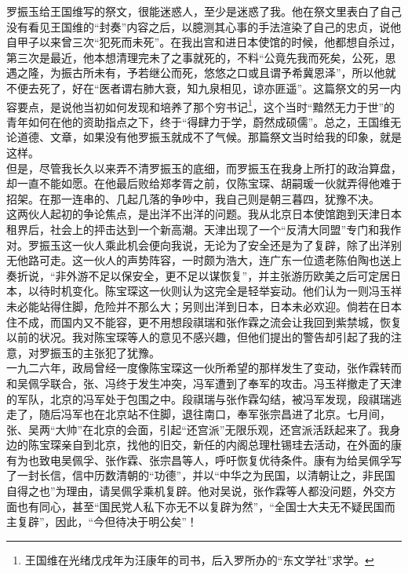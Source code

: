 罗振玉给王国维写的祭文，很能迷惑人，至少是迷惑了我。他在祭文里表白了自己没有看见王国维的“封奏”内容之后，以臆测其心事的手法渲染了自己的忠贞，说他自甲子以来曾三次“犯死而未死”。在我出宫和进日本使馆的时候，他都想自杀过，第三次是最近，他本想清理完未了之事就死的，不料“公竟先我而死矣，公死，思遇之隆，为振古所未有，予若继公而死，悠悠之口或且谓予希冀恩泽”，所以他就不便去死了，好在“医者谓右肺大衰，知九泉相见，谅亦匪遥”。这篇祭文的另一内容要点，是说他当初如何发现和培养了那个穷书记\footnote{王国维在光绪戊戌年为汪康年的司书，后入罗所办的“东文学社”求学。}，这个当时“黯然无力于世”的青年如何在他的资助指点之下，终于“得肆力于学，蔚然成硕儒”。总之，王国维无论道德、文章，如果没有他罗振玉就成不了气候。那篇祭文当时给我的印象，就是这样。\\

但是，尽管我长久以来弄不清罗振玉的底细，而罗振玉在我身上所打的政治算盘，却一直不能如愿。在他最后败给郑孝胥之前，仅陈宝琛、胡嗣瑗一伙就弄得他难于招架。在那一连串的、几起几落的争吵中，我自己则是朝三暮四，犹豫不决。\\

这两伙人起初的争论焦点，是出洋不出洋的问题。我从北京日本使馆跑到天津日本租界后，社会上的抨击达到一个新高潮。天津出现了一个“反清大同盟”专门和我作对。罗振玉这一伙人乘此机会便向我说，无论为了安全还是为了复辟，除了出洋别无他路可走。这一伙人的声势阵容，一时颇为浩大，连广东一位遗老陈伯陶也送上奏折说，“非外游不足以保安全，更不足以谋恢复”，并主张游历欧美之后可定居日本，以待时机变化。陈宝琛这一伙则认为这完全是轻举妄动。他们认为一则冯玉祥未必能站得住脚，危险并不那么大；另则出洋到日本，日本未必欢迎。倘若在日本住不成，而国内又不能容，更不用想段祺瑞和张作霖之流会让我回到紫禁城，恢复以前的状况。我对陈宝琛等人的意见不感兴趣，但他们提出的警告却引起了我的注意，对罗振玉的主张犯了犹豫。\\

一九二六年，政局曾经一度像陈宝琛这一伙所希望的那样发生了变动，张作霖转而和吴佩孚联合，张、冯终于发生冲突，冯军遭到了奉军的攻击。冯玉祥撤走了天津的军队，北京的冯军处于包围之中。段祺瑞与张作霖勾结，被冯军发现，段祺瑞逃走了，随后冯军也在北京站不住脚，退往南口，奉军张宗昌进了北京。七月间，张、吴两“大帅”在北京的会面，引起“还宫派”无限乐观，还宫派活跃起来了。我身边的陈宝琛亲自到北京，找他的旧交，新任的内阁总理杜锡珪去活动，在外面的康有为也致电吴佩孚、张作霖、张宗昌等人，呼吁恢复优待条件。康有为给吴佩孚写了一封长信，信中历数清朝的“功德”，并以“中华之为民国，以清朝让之，非民国自得之也”为理由，请吴佩孚乘机复辟。他对吴说，张作霖等人都没问题，外交方面也有同心，甚至“国民党人私下亦无不以复辟为然”，“全国士大夫无不疑民国而主复辟”，因此，“今但待决于明公矣”！\\

